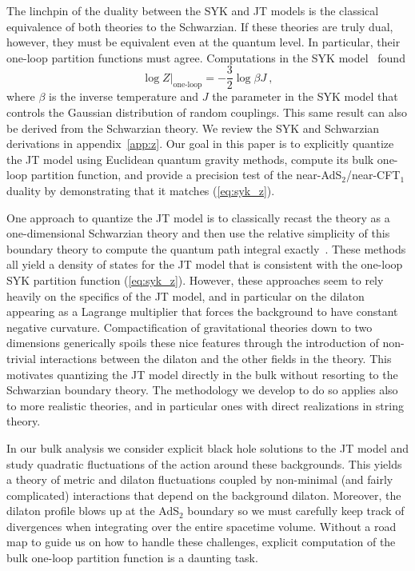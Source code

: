 \documentclass[12pt]{article}
\begin{document}
The linchpin of the duality between the SYK and JT models is the classical equivalence of both theories to the Schwarzian.  If these theories are truly dual, however, they must be equivalent even at the quantum level. In particular, their one-loop partition functions must agree. Computations in the SYK model~\cite{Maldacena:2016hyu} found
%
\begin{equation}
	\log Z|_\text{one-loop} = - \frac{3}{2} \log \beta J~,
\label{eq:syk_z}
\end{equation}
%
where $\beta$ is the inverse temperature and $J$ the parameter in the SYK model that controls the Gaussian distribution of random couplings.  This same result can also be derived from the Schwarzian theory. We review the SYK and Schwarzian derivations in appendix~\ref{app:z}.  
Our goal in this paper is to explicitly quantize the JT model using Euclidean quantum gravity methods, compute its bulk one-loop partition function, and provide a precision test of the near-AdS$_2$/near-CFT$_1$ duality by demonstrating that it matches (\ref{eq:syk_z}).  %

One approach to quantize the JT model is to classically recast the theory as a one-dimensional Schwarzian theory and then 
use the relative simplicity of this boundary theory to compute the quantum path integral exactly~\cite{Stanford:2017thb,Kitaev:2018wpr,Yang:2018gdb,Saad:2019lba,Iliesiu:2019xuh,Stanford:2019vob}.  These methods all yield a density of states for the JT model that is consistent with the one-loop SYK partition function (\ref{eq:syk_z}).  However, these approaches seem to rely heavily on the specifics of the JT model, and in particular on the dilaton appearing as a Lagrange multiplier that forces the background to have constant negative curvature. Compactification of gravitational theories down to two dimensions generically spoils these nice features through the introduction of non-trivial interactions between the dilaton and the other fields in the theory.  This motivates quantizing the JT model directly in the bulk without resorting to the Schwarzian boundary theory. The methodology we develop to do so applies also to more realistic theories, and in particular ones with direct realizations in string theory.

In our bulk analysis we consider explicit black hole solutions to the JT model and study quadratic fluctuations of the action around these backgrounds. This yields a theory of metric and dilaton fluctuations coupled by non-minimal (and fairly complicated) interactions that depend on the background dilaton. Moreover, the dilaton profile blows up at the AdS$_2$ boundary so we must carefully keep track of divergences when integrating over the entire spacetime volume. Without a road map to guide us on how to handle these challenges, explicit computation of the bulk one-loop partition function is a daunting task.  
\end{document}
